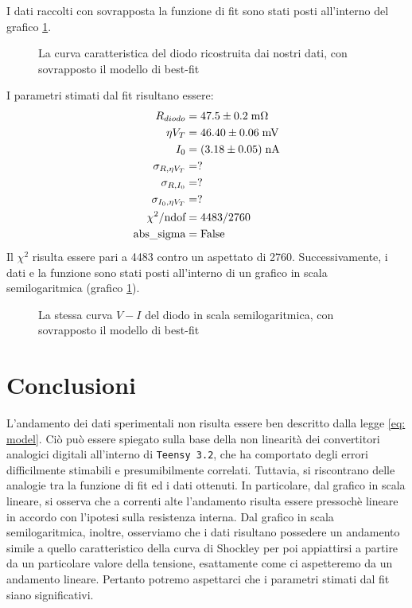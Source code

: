 \documentclass{article}[a4paper, oneside, 11pt]
\begin{document}
I dati raccolti con sovrapposta la funzione di fit sono stati posti all'interno 
del grafico \ref{fig: sck_lin}.
\begin{figure}[!htb]
	\centering 
	\caption{La curva caratteristica del diodo ricostruita dai nostri
	dati, con sovrapposto il modello di best-fit \label{fig: sck_lin}}
\end{figure}
I parametri stimati dal fit risultano essere:
\begin{align*}
	R_{diodo} &= 47.5 \pm 0.2 \; \rm m\Omega \\
	\eta V_T &= 46.40 \pm 0.06 \; \rm mV \\
	I_0 &= (3.18 \pm 0.05) \; \rm nA \\
	\sigma_{R, \eta V_T} &= ? \\   
	\sigma_{R, I_0} &= ? \\
	\sigma_{I_0, \eta V_T} &= ? \\
	\chi^2/\text{ndof} &= 4483/2760 \\
	\text{abs\_sigma} &= \rm False
\end{align*}
Il $\chi^2$ risulta essere pari a 4483 contro un aspettato di 2760.
Successivamente, i dati e la funzione sono stati posti all'interno di un
grafico in scala semilogaritmica (grafico \ref{fig: sck_lin}).
\begin{figure}[!htb]
	\centering 
	\caption{La stessa curva $V-I$ del diodo in scala semilogaritmica,
	con sovrapposto il modello di best-fit \label{fig: sck_log}}
\end{figure}

\section{Conclusioni}
L'andamento dei dati sperimentali non risulta essere ben descritto dalla legge
\eqref{eq: model}. Ciò può essere spiegato sulla base della non linearità dei
convertitori analogici digitali all'interno di \verb+Teensy 3.2+, che ha 
comportato
degli errori difficilmente stimabili e presumibilmente correlati. Tuttavia, si
riscontrano delle analogie tra la funzione di fit ed i dati ottenuti. In
particolare, dal grafico in scala lineare, si osserva che a correnti alte
l'andamento risulta essere pressoch\`e lineare in accordo con l'ipotesi sulla
resistenza interna. Dal grafico in scala semilogaritmica, inoltre, osserviamo
che i dati risultano possedere un andamento simile a quello caratteristico 
della curva di Shockley per poi appiattirsi a partire da un particolare valore
della tensione, esattamente come ci aspetteremo da un andamento lineare.
Pertanto potremo aspettarci che i parametri stimati dal fit siano significativi.
\end{document}
